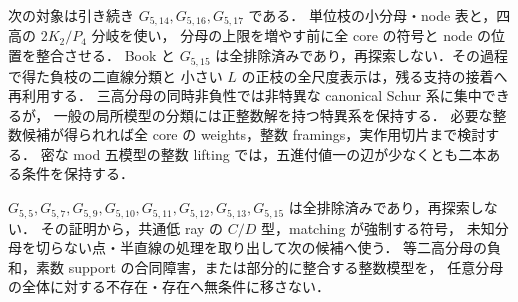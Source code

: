 次の対象は引き続き $G_{5,14},G_{5,16},G_{5,17}$ である．
単位枝の小分母・node 表と，四高の $2K_2/P_4$ 分岐を使い，
分母の上限を増やす前に全 core の符号と node の位置を整合させる．
Book と $G_{5,15}$ は全排除済みであり，再探索しない．その過程で得た負枝の二直線分類と
小さい $L$ の正枝の全尺度表示は，残る支持の接着へ再利用する．
三高分母の同時非負性では非特異な canonical Schur 系に集中できるが，
一般の局所模型の分類には正整数解を持つ特異系を保持する．
必要な整数候補が得られれば全 core の weights，整数 framings，実作用切片まで検討する．
密な mod 五模型の整数 lifting では，五進付値一の辺が少なくとも二本ある条件を保持する．

$G_{5,5},G_{5,7},G_{5,9},G_{5,10},G_{5,11},G_{5,12},G_{5,13},G_{5,15}$ は全排除済みであり，再探索しない．
その証明から，共通低 ray の $C/D$ 型，matching が強制する符号，
未知分母を切らない点・半直線の処理を取り出して次の候補へ使う．
等二高分母の負和，素数 support の合同障害，または部分的に整合する整数模型を，
任意分母の全体に対する不存在・存在へ無条件に移さない．

